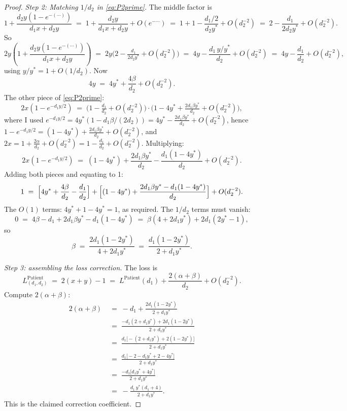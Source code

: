 \documentclass{article}
\theoremstyle{plain}
\theoremstyle{definition}
\begin{document}
\begin{proof}
\emph{Step 2: Matching $1/d_2$ in \eqref{eq:P2prime}.} The middle factor is
\[
1+\frac{d_2 y(1-e^{-(\cdots)})}{d_1 x+d_2 y}\;=\;1+\frac{d_2 y}{d_1 x+d_2 y}+O(e^{-\cdots})\;=\;1+1-\frac{d_1/2}{d_2 y^\ast}+O(d_2^{-2})\;=\;2-\frac{d_1}{2 d_2 y^\ast}+O(d_2^{-2}).
\]
So
\[
2y\!\left(1+\frac{d_2 y(1-e^{-(\cdots)})}{d_1 x+d_2 y}\right)\;=\;2y\bigl(2-\tfrac{d_1}{2 d_2 y^\ast}+O(d_2^{-2})\bigr)\;=\;4y-\frac{d_1\,y/y^\ast}{d_2}+O(d_2^{-2})\;=\;4y-\frac{d_1}{d_2}+O(d_2^{-2}),
\]
using $y/y^\ast=1+O(1/d_2)$. Now
\[
4y\;=\;4 y^\ast+\frac{4\beta}{d_2}+O(d_2^{-2}).
\]
The other piece of \eqref{eq:P2prime}:
\[
2x(1-e^{-d_1 y/2})\;=\;\bigl(1-\tfrac{d_1}{d_2}+O(d_2^{-2})\bigr)\cdot\bigl(1-4y^\ast+\tfrac{2 d_1\beta y^\ast}{d_2}+O(d_2^{-2})\bigr),
\]
where I used $e^{-d_1 y/2}=4y^\ast(1-d_1\beta/(2 d_2))=4y^\ast-\frac{2 d_1\beta y^\ast}{d_2}+O(d_2^{-2})$, hence $1-e^{-d_1 y/2}=(1-4y^\ast)+\frac{2 d_1\beta y^\ast}{d_2}+O(d_2^{-2})$, and $2x=1+\frac{2\alpha}{d_2}+O(d_2^{-2})=1-\frac{d_1}{d_2}+O(d_2^{-2})$. Multiplying:
\[
2x(1-e^{-d_1 y/2})\;=\;(1-4y^\ast)+\frac{2 d_1\beta y^\ast}{d_2}-\frac{d_1(1-4y^\ast)}{d_2}+O(d_2^{-2}).
\]
Adding both pieces and equating to 1:
\[
1\;=\;\Bigl[4 y^\ast+\frac{4\beta}{d_2}-\frac{d_1}{d_2}\Bigr]+\Bigl[(1-4y^\ast)+\frac{2 d_1\beta y^\ast-d_1(1-4y^\ast)}{d_2}\Bigr]+O(d_2^{-2}).
\]
The $O(1)$ terms: $4y^\ast+1-4y^\ast=1$, as required. The $1/d_2$ terms must vanish:
\[
0\;=\;4\beta-d_1+2 d_1\beta y^\ast-d_1(1-4y^\ast)\;=\;\beta(4+2 d_1 y^\ast)+2 d_1(2y^\ast-1),
\]
so
\[
\beta\;=\;\frac{2 d_1(1-2y^\ast)}{4+2 d_1 y^\ast}\;=\;\frac{d_1(1-2y^\ast)}{2+d_1 y^\ast}.
\]

\emph{Step 3: assembling the loss correction.} The loss is
\[
L^{\text{Patient}}_{(d_1,d_2)}\;=\;2(x+y)-1\;=\;L^{\text{Patient}}(d_1)+\frac{2(\alpha+\beta)}{d_2}+O(d_2^{-2}).
\]
Compute $2(\alpha+\beta)$:
\begin{align*}
2(\alpha+\beta)\;&=\;-d_1+\frac{2 d_1(1-2y^\ast)}{2+d_1 y^\ast}\\
&=\;\frac{-d_1(2+d_1 y^\ast)+2 d_1(1-2y^\ast)}{2+d_1 y^\ast}\\
&=\;\frac{d_1\bigl[-(2+d_1 y^\ast)+2(1-2y^\ast)\bigr]}{2+d_1 y^\ast}\\
&=\;\frac{d_1\bigl[-2-d_1 y^\ast+2-4y^\ast\bigr]}{2+d_1 y^\ast}\\
&=\;\frac{-d_1\bigl[d_1 y^\ast+4 y^\ast\bigr]}{2+d_1 y^\ast}\\
&=\;-\frac{d_1\,y^\ast(d_1+4)}{2+d_1 y^\ast}.
\end{align*}
This is the claimed correction coefficient.
\end{proof}
\end{document}
